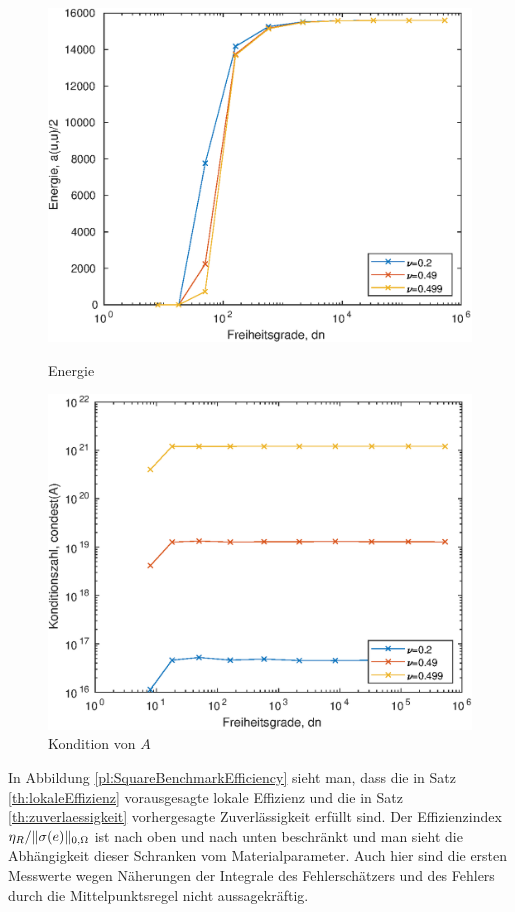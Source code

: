 \documentclass{scrartcl}
\DeclarePairedDelimiter{\norm}{\lVert}{\rVert}
\begin{document}
\begin{figure}[h]
\centering
\begin{minipage}[b]{0.45\textwidth}
\centering
\includegraphics[width=\textwidth]{Plots/SquareBenchmarkTotalEnergy1}
\caption{Energie}
\label{pl:SquareBenchmarkTotalEnergy}
\end{minipage}
\hfill
\begin{minipage}[b]{0.45\textwidth}
\centering
\includegraphics[width=\textwidth]{Plots/SquareBenchmarkCondition1}
\caption{Kondition von $A$}
\label{pl:SquareBenchmarkCondition}
\end{minipage}
\end{figure}
\newpage
In Abbildung \ref{pl:SquareBenchmarkEfficiency} sieht man, dass die in Satz \ref{th:lokaleEffizienz} vorausgesagte lokale Effizienz und die in Satz \ref{th:zuverlaessigkeit} vorhergesagte Zuverlässigkeit erfüllt sind. Der Effizienzindex $\eta_R/\norm{\sigma(e)}_{0,\Omega}$ ist nach oben und nach unten beschränkt und man sieht die Abhängigkeit dieser Schranken vom Materialparameter. Auch hier sind die ersten Messwerte wegen Näherungen der Integrale des Fehlerschätzers und des Fehlers durch die Mittelpunktsregel nicht aussagekräftig.
\end{document}
